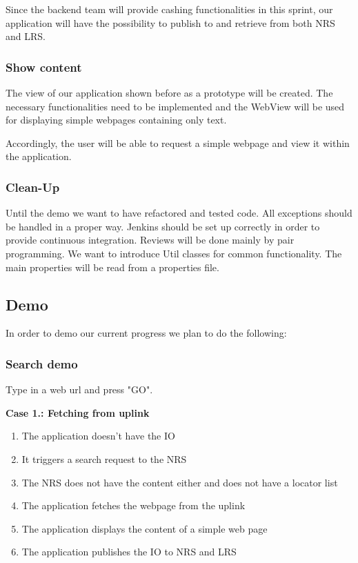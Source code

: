 \documentclass[a4paper,10pt]{article}
\begin{document}
Since the backend team will provide cashing functionalities in this sprint, our application will
have the possibility to publish to and retrieve from both NRS and LRS.

\subsubsection{Show content}
The view of our application shown before as a prototype will be created. The necessary functionalities
need to be implemented and the WebView will be used for displaying simple webpages containing only text.

Accordingly, the user will be able to request a simple webpage and view it within the application.

\subsubsection{Clean-Up}
Until the demo we want to have refactored and tested code. All exceptions 
should be handled in a proper way. Jenkins should be set up correctly in order to provide continuous integration.
Reviews will be done mainly by pair programming. 
We want to introduce Util classes for common functionality. 
The main properties will be read from a properties file.

\subsection{Demo}
\label{sect:demo}
In order to demo our current progress we plan to do the following:

\subsubsection{Search demo}
Type in a web url and press "GO".

\textbf{Case 1.: Fetching from uplink}

 \begin{enumerate}
  \item The application doesn't have the IO
  \item It triggers a search request to the NRS
  \item The NRS does not have the content either and does not have a locator list
  \item The application fetches the webpage from the uplink
  \item The application displays the content of a simple web page
  \item The application publishes the IO to NRS and LRS
 \end{enumerate}
 
\end{document}
